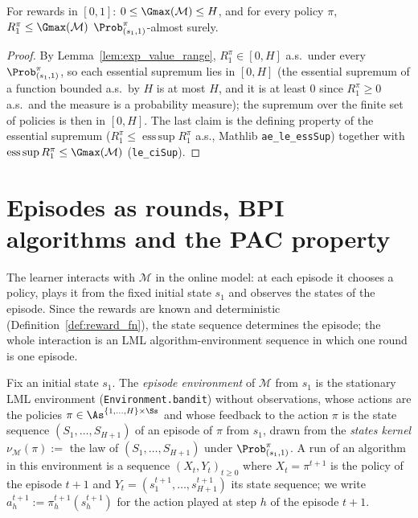 \begin{lemma}\label{lem:gmax_le_horizon}
\leanok
{}
For rewards in $[0, 1]$: $0 \le \Gmax(\mathcal M) \le H$, and for every policy $\pi$,
$R^\pi_1 \le \Gmax(\mathcal M)$ $\Prob^\pi_{(s_1, 1)}$-almost surely.
\end{lemma}

\begin{proof}
\leanok
By Lemma~\ref{lem:exp_value_range}, $R^\pi_1 \in [0, H]$ a.s.\ under every $\Prob^\pi_{(s_1, 1)}$, so
each essential supremum lies in $[0, H]$ (the essential supremum of a function bounded a.s.\ by
$H$ is at most $H$, and it is at least $0$ since $R^\pi_1 \ge 0$ a.s.\ and the measure is a
probability measure); the supremum over the finite set of policies is then in $[0, H]$. The
last claim is the defining property of the essential supremum
($R^\pi_1 \le \operatorname{ess\,sup} R^\pi_1$ a.s., Mathlib \texttt{ae\_le\_essSup}) together with
$\operatorname{ess\,sup} R^\pi_1 \le \Gmax(\mathcal M)$ (\texttt{le\_ciSup}).
\end{proof}

\section{Episodes as rounds, BPI algorithms and the PAC property}
\label{sec:mdp_bpi}

The learner interacts with $\mathcal M$ in the online model: at each episode it chooses a
policy, plays it from the fixed initial state $s_1$ and observes the states of the episode.
Since the rewards are known and deterministic (Definition~\ref{def:reward_fn}), the state
sequence determines the episode; the whole interaction is an LML algorithm-environment
sequence in which one round is one episode.

\begin{definition}\label{def:episode_env}
\leanok
{}
Fix an initial state $s_1$. The \emph{episode environment} of $\mathcal M$ from $s_1$ is the
stationary LML environment (\texttt{Environment.bandit}) without observations, whose actions are the
policies $\pi \in \As^{\{1, \dots, H\} \times \Ss}$ and whose feedback to the action $\pi$ is the
state sequence $(S_1, \dots, S_{H+1})$ of an episode of $\pi$ from $s_1$, drawn from the
\emph{states kernel} $\nu_{\mathcal M}(\pi) :=$ the law of $(S_1, \dots, S_{H+1})$ under
$\Prob^\pi_{(s_1, 1)}$. A run of an algorithm in this environment is a sequence
$(X_t, Y_t)_{t \ge 0}$ where $X_t = \pi^{t+1}$ is the policy of the episode $t + 1$ and
$Y_t = (s^{t+1}_1, \dots, s^{t+1}_{H+1})$ its state sequence; we write $a^{t+1}_h := \pi^{t+1}_h(s^{t+1}_h)$
for the action played at step $h$ of the episode $t + 1$.
\end{definition}

